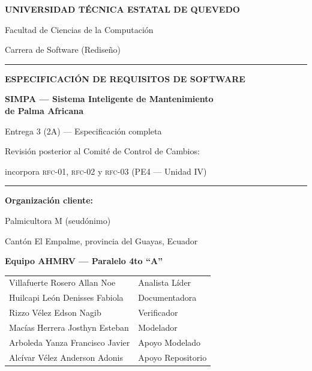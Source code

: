 \documentclass[11pt,a4paper]{article}
\begin{document}
\begin{titlepage}
\centering
\vspace*{0.8cm}
{\Large\bfseries UNIVERSIDAD TÉCNICA ESTATAL DE QUEVEDO\par}
\vspace{0.3cm}
{\large Facultad de Ciencias de la Computación\par}
{\large Carrera de Software (Rediseño)\par}
\vspace{1.2cm}
\rule{\textwidth}{1.2pt}\par
\vspace{0.5cm}
{\LARGE\bfseries\color{uteqverde} ESPECIFICACIÓN DE REQUISITOS DE SOFTWARE\par}
\vspace{0.4cm}
{\Large\bfseries SIMPA --- Sistema Inteligente de Mantenimiento\\[0.2cm] de Palma Africana\par}
\vspace{0.4cm}
{\large Entrega 3 (2A) --- Especificación completa\par}
\vspace{0.15cm}
{\normalsize Revisión posterior al Comité de Control de Cambios:\par}
{\normalsize incorpora \textsc{rfc-01}, \textsc{rfc-02} y \textsc{rfc-03} (PE4 --- Unidad IV)\par}
\vspace{0.5cm}
\rule{\textwidth}{1.2pt}\par
\vspace{1.0cm}

{\large\bfseries Organización cliente:\par}
{\large Palmicultora M (seudónimo)\par}
{\normalsize Cantón El Empalme, provincia del Guayas, Ecuador\par}
\vspace{0.8cm}

{\bfseries Equipo AHMRV --- Paralelo 4to ``A''\par}
\vspace{0.3cm}
\begin{tabular}{ll}
Villafuerte Rosero Allan Noe & Analista Líder \\
Huilcapi León Denisses Fabiola & Documentadora \\
Rizzo Vélez Edson Nagib & Verificador \\
Macías Herrera Josthyn Esteban & Modelador \\
Arboleda Yanza Francisco Javier & Apoyo Modelado \\
Alcívar Vélez Anderson Adonis & Apoyo Repositorio \\
\end{tabular}


\end{titlepage}
\end{document}
